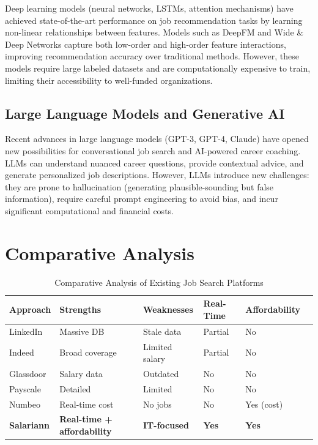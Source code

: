Deep learning models (neural networks, LSTMs, attention mechanisms) have achieved state-of-the-art performance on job recommendation tasks by learning non-linear relationships between features. Models such as DeepFM and Wide \& Deep Networks capture both low-order and high-order feature interactions, improving recommendation accuracy over traditional methods. However, these models require large labeled datasets and are computationally expensive to train, limiting their accessibility to well-funded organizations.

\subsection{Large Language Models and Generative AI}

Recent advances in large language models (GPT-3, GPT-4, Claude) have opened new possibilities for conversational job search and AI-powered career coaching. LLMs can understand nuanced career questions, provide contextual advice, and generate personalized job descriptions. However, LLMs introduce new challenges: they are prone to hallucination (generating plausible-sounding but false information), require careful prompt engineering to avoid bias, and incur significant computational and financial costs.

\section{Comparative Analysis}

\begin{table}[H]
\centering
\caption{Comparative Analysis of Existing Job Search Platforms}
\label{tab:comparative}
\begin{tabular}{|l|l|l|l|l|l|}
\hline
\textbf{Approach} & \textbf{Strengths} & \textbf{Weaknesses} & \textbf{Real-Time} & \textbf{Affordability} \\
\hline
LinkedIn & Massive DB & Stale data & Partial & No \\
\hline
Indeed & Broad coverage & Limited salary & Partial & No \\
\hline
Glassdoor & Salary data & Outdated & No & No \\
\hline
Payscale & Detailed & Limited & No & No \\
\hline
Numbeo & Real-time cost & No jobs & No & Yes (cost) \\
\hline
\textbf{Salariann} & \textbf{Real-time + affordability} & \textbf{IT-focused} & \textbf{Yes} & \textbf{Yes} \\
\hline
\end{tabular}
\end{table}

